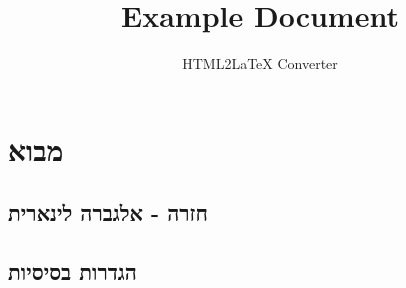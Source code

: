 \documentclass{tstextbook}
\begin{document}
\title{Example Document}
\author{HTML2LaTeX Converter}
\maketitle

\chapter{מבוא}

\section{חזרה - אלגברה לינארית}

\section{הגדרות בסיסיות}
\end{document}
